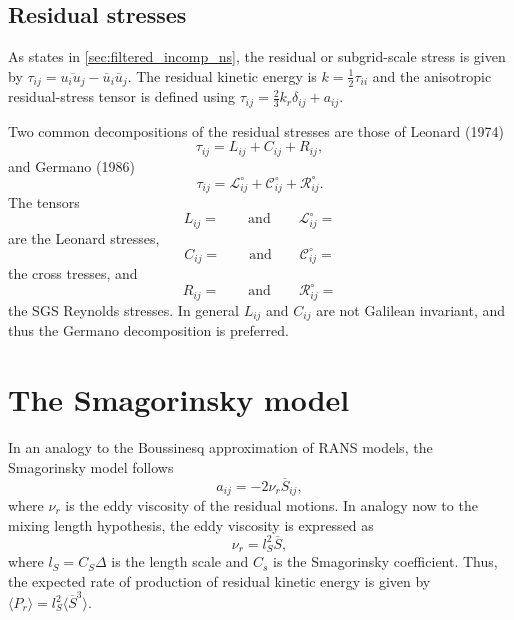 \documentclass[oneside,a4paper,11pt]{report}
\newcommand{\rs}{\tau}          %
\newcommand{\ars}{a}            %
\newcommand{\ures}{\overline{u}}
\begin{document}
\subsection{Residual stresses}
As states in \cref{sec:filtered_incomp_ns}, the residual or subgrid-scale stress is given by $\rs_{ij} = \overline{ u_i u_j} - \ures_i \ures_j$. The residual kinetic energy is $k = \frac{1}{2} \rs_{ii}$ and the anisotropic residual-stress tensor is defined using $\rs_{ij} = \frac{2}{3} k_r \delta_{ij} + \ars_{ij}$.

Two common decompositions of the residual stresses are those of Leonard (1974)
\begin{equation}
\rs_{ij} = L_{ij} + C_{ij} + R_{ij},
\end{equation}
and Germano (1986)
\begin{equation}
\rs_{ij} = \mathcal{L}^\circ_{ij} + \mathcal{C}^\circ_{ij} + \mathcal{R}^\circ_{ij}.
\end{equation}
The tensors 
\begin{equation}
L_{ij} = \qquad \text{and} \qquad \mathcal{L}^\circ_{ij} = 
\end{equation}
are the Leonard stresses, 
\begin{equation}
C_{ij} = \qquad \text{and} \qquad \mathcal{C}^\circ_{ij} = 
\end{equation}
the cross tresses, and 
\begin{equation}
R_{ij} = \qquad \text{and} \qquad \mathcal{R}^\circ_{ij} = 
\end{equation}
the SGS Reynolds stresses. In general $L_{ij}$ and $C_{ij}$ are not Galilean invariant, and thus the Germano decomposition is preferred.

\section{The Smagorinsky model}
In an analogy to the Boussinesq approximation of RANS models, the Smagorinsky model follows
\begin{equation}
a_{ij} = -2 \nu_r \overline{S}_{ij},
\end{equation}
where $\nu_r$ is the eddy viscosity of the residual motions. In analogy now to the mixing length hypothesis, the eddy viscosity is expressed as
\begin{equation}
\nu_r = l_S^2 \overline{S},
\end{equation}
where $l_S = C_S \Delta$ is the length scale and $C_s$ is the Smagorinsky coefficient. Thus, the expected rate of production of residual kinetic energy is given by $\langle P_r \rangle = l_S^2 \langle \overline{S}^3 \rangle$.
\end{document}

